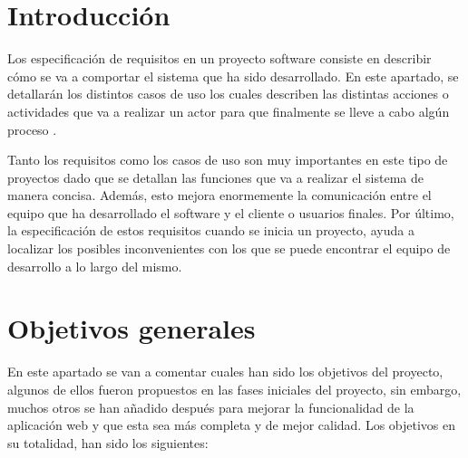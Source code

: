 
\section{Introducción}

Los especificación de requisitos en un proyecto software consiste en describir cómo se va a comportar el sistema que ha sido desarrollado. En este apartado, se detallarán los distintos casos de uso los cuales describen las distintas acciones o actividades que va a realizar un actor para que finalmente se lleve a cabo algún proceso \cite{especificacionrequisitos:latex}.

Tanto los requisitos como los casos de uso son muy importantes en este tipo de proyectos dado que se detallan las funciones que va a realizar el sistema de manera concisa. Además, esto mejora enormemente la comunicación entre el equipo que ha desarrollado el software y el cliente o usuarios finales. Por último, la especificación de estos requisitos cuando se inicia un proyecto, ayuda a localizar los posibles inconvenientes con los que se puede encontrar el equipo de desarrollo a lo largo del mismo.

\section{Objetivos generales}

En este apartado se van a comentar cuales han sido los objetivos del proyecto, algunos de ellos fueron propuestos en las fases iniciales del proyecto, sin embargo, muchos otros se han añadido después para mejorar la funcionalidad de la aplicación web y que esta sea más completa y de mejor calidad. Los objetivos en su totalidad, han sido los siguientes:

